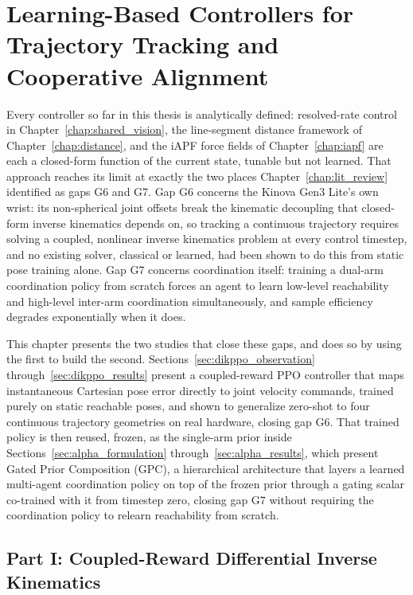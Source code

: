 \chapter{Learning-Based Controllers for Trajectory Tracking and Cooperative Alignment}
\label{chap:learned_control}

Every controller so far in this thesis is analytically defined: resolved-rate control in
Chapter~\ref{chap:shared_vision}, the line-segment distance framework of
Chapter~\ref{chap:distance}, and the iAPF force fields of Chapter~\ref{chap:iapf} are
each a closed-form function of the current state, tunable but not learned. That approach reaches
its limit at exactly the two places Chapter~\ref{chap:lit_review} identified as gaps G6 and G7.
Gap G6 concerns the Kinova Gen3 Lite's own wrist: its non-spherical joint offsets break the
kinematic decoupling that closed-form inverse kinematics depends on, so tracking a continuous
trajectory requires solving a coupled, nonlinear inverse kinematics problem at every control
timestep, and no existing solver, classical or learned, had been shown to do this from static pose
training alone. Gap G7 concerns coordination itself: training a dual-arm coordination policy from
scratch forces an agent to learn low-level reachability and high-level inter-arm coordination
simultaneously, and sample efficiency degrades exponentially when it does.

This chapter presents the two studies that close these gaps, and does so by using the first to
build the second. Sections~\ref{sec:dikppo_observation} through~\ref{sec:dikppo_results} present a
coupled-reward PPO controller that maps instantaneous Cartesian pose error directly to joint
velocity commands, trained purely on static reachable poses, and shown to generalize zero-shot to
four continuous trajectory geometries on real hardware, closing gap G6. That trained policy is then
reused, frozen, as the single-arm prior inside Sections~\ref{sec:alpha_formulation}
through~\ref{sec:alpha_results}, which present Gated Prior Composition (GPC), a hierarchical
architecture that layers a learned multi-agent coordination policy on top of the frozen prior
through a gating scalar co-trained with it from timestep zero, closing gap G7 without requiring the
coordination policy to relearn reachability from scratch.

\section*{Part I: Coupled-Reward Differential Inverse Kinematics}
{}

